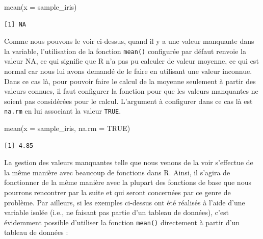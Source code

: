 \documentclass[
  letterpaper,
]{book}
\newenvironment{Shaded}{\begin{snugshade}}{\end{snugshade}}
\newcommand{\AttributeTok}[1]{\textcolor[rgb]{0.40,0.45,0.13}{#1}}
\newcommand{\ConstantTok}[1]{\textcolor[rgb]{0.56,0.35,0.01}{#1}}
\newcommand{\FunctionTok}[1]{\textcolor[rgb]{0.28,0.35,0.67}{#1}}
\newcommand{\NormalTok}[1]{\textcolor[rgb]{0.00,0.23,0.31}{#1}}
\newcommand{\SpecialCharTok}[1]{\textcolor[rgb]{0.37,0.37,0.37}{#1}}
\begin{document}
\begin{Shaded}
\begin{Highlighting}[]
\FunctionTok{mean}\NormalTok{(}\AttributeTok{x =}\NormalTok{ sample\_iris)}
\end{Highlighting}
\end{Shaded}

\begin{verbatim}
[1] NA
\end{verbatim}

Comme nous pouvons le voir ci-dessus, quand il y a une valeur manquante
dans la variable, l'utilisation de la fonction \texttt{mean()}
configurée par défaut renvoie la valeur NA, ce qui signifie que R n'a
pas pu calculer de valeur moyenne, ce qui est normal car nous lui avons
demandé de le faire en utilisant une valeur inconnue. Dans ce cas là,
pour pouvoir faire le calcul de la moyenne seulement à partir des
valeurs connues, il faut configurer la fonction pour que les valeurs
manquantes ne soient pas considérées pour le calcul. L'argument à
configurer dans ce cas là est \texttt{na.rm} en lui associant la valeur
\texttt{TRUE}.

\begin{Shaded}
\begin{Highlighting}[]
\FunctionTok{mean}\NormalTok{(}\AttributeTok{x =}\NormalTok{ sample\_iris, }\AttributeTok{na.rm =} \ConstantTok{TRUE}\NormalTok{)}
\end{Highlighting}
\end{Shaded}

\begin{verbatim}
[1] 4.85
\end{verbatim}

La gestion des valeurs manquantes telle que nous venons de la voir
s'effectue de la même manière avec beaucoup de fonctions dans R. Ainsi,
il s'agira de fonctionner de la même manière avec la plupart des
fonctions de base que nous pourrons rencontrer par la suite et qui
seront concernées par ce genre de problème. Par ailleurs, si les
exemples ci-dessus ont été réalisés à l'aide d'une variable isolée
(i.e., ne faisant pas partie d'un tableau de données), c'est évidemment
possible d'utiliser la fonction \texttt{mean()} directement à partir
d'un tableau de données :

\begin{Shaded}
\end{Shaded}
\end{document}
